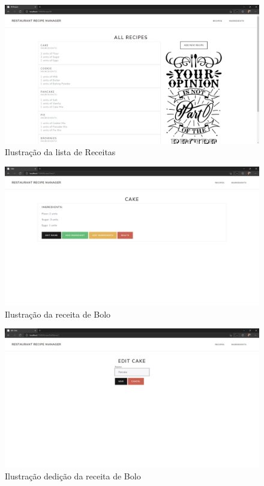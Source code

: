 \begin{figure}[!hbt]
    \centering
    \includegraphics[width=14cm]{Resources/WebApp/Recipes/recipe (1).png}
    \caption{Ilustração da lista de Receitas}
    
\end{figure}
\FloatBarrier
\begin{figure}[!hbt]
    \centering
    \includegraphics[width=14cm]{Resources/WebApp/Recipes/recipe (2).png}
    \caption{Ilustração da receita de Bolo}
    
\end{figure}
\FloatBarrier
\begin{figure}[!hbt]
    \centering
    \includegraphics[width=14cm]{Resources/WebApp/Recipes/recipe (3).png}
    \caption{Ilustração dedição da receita de Bolo}
    
\end{figure}
